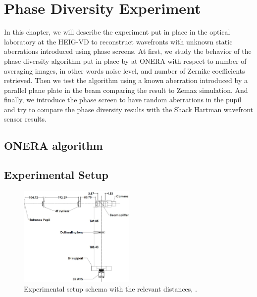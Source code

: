 
\chapter{Phase Diversity Experiment} 
\label{ch:PDExp}

In this chapter, we will describe the experiment put in place in the optical laboratory at the HEIG-VD to reconstruct wavefronts with unknown static aberrations introduced using phase screens. At first, we study the  behavior of the phase diversity algorithm put in place by \citet{mugnier_2006} at ONERA with respect to number of averaging images, in other words noise level, and number of Zernike coefficients retrieved. Then we test the algorithm using a known aberration introduced by a parallel plane plate in the beam comparing the result to Zemax simulation. And finally, we introduce the phase screen to have random aberrations in the pupil and try to compare the phase diversity results with the Shack Hartman wavefront sensor results.


\section{ONERA algorithm}
\label{sec:ONERAalgorithm}




\section{Experimental Setup}
\label{sec:ExpSetup}

\begin{figure}
\centering
\includegraphics[width=0.5\textwidth]{Figures/setupSchema.JPG}
\decoRulewrapFig
\caption[Schema of the experimental setup]{Experimental setup schema with the relevant distances, \citep{Bouxin_PDM}.}
\label{fig:setupSchema}
\end{figure}

